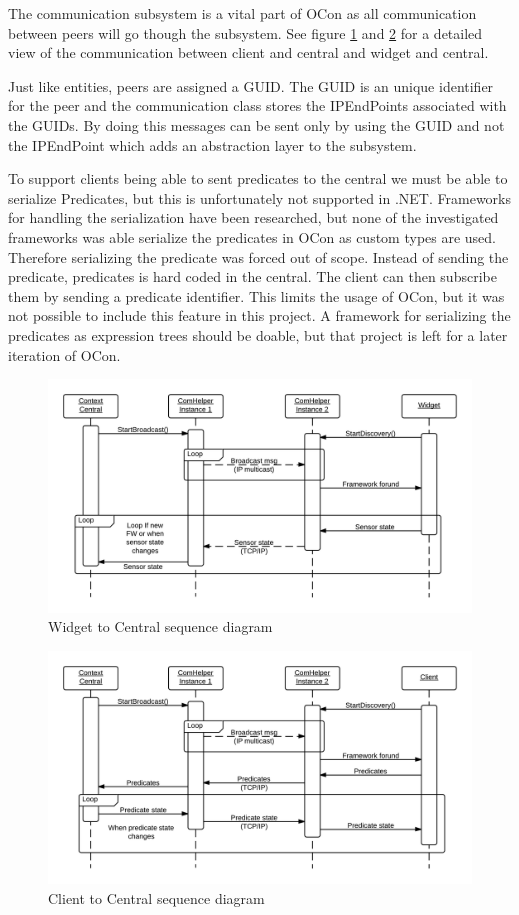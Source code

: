 \documentclass[../report.tex]{subfiles}
\begin{document}
The communication subsystem is a vital part of OCon as all communication between peers will go though the subsystem. See figure \ref{fig:widgetComHelper} and \ref{fig:clientComHelper} for a detailed view of the communication between client and central and widget and central.

Just like entities, peers are assigned a GUID. The GUID is an unique identifier for the peer and the communication class stores the IPEndPoints associated with the GUIDs. By doing this messages can be sent only by using the GUID and not the IPEndPoint which adds an abstraction layer to the subsystem.

To support clients being able to sent predicates to the central we must be able to serialize Predicates, but this is unfortunately not supported in .NET. Frameworks for handling the serialization have been researched, but none of the investigated frameworks was able serialize the predicates in OCon as custom types are used. Therefore serializing the predicate was forced out of scope. Instead of sending the predicate, predicates is hard coded in the central. The client can then subscribe them by sending a predicate identifier. This limits the usage of OCon, but it was not possible to include this feature in this project. A framework for serializing the predicates as expression trees should be doable, but that project is left for a later iteration of OCon.

\begin{figure}[h]
\centering
\includegraphics[width=\linewidth]{comHelperSequence-widget.png}
\caption{Widget to Central sequence diagram}
\label{fig:widgetComHelper}
\end{figure}

\begin{figure}[h]
\centering
\includegraphics[width=\linewidth]{comHelperSequence-client.png}
\caption{Client to Central sequence diagram}
\label{fig:clientComHelper}
\end{figure}
\end{document}
